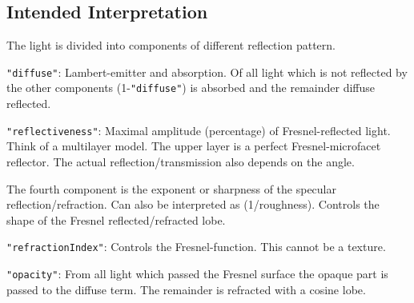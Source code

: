 \documentclass[english,10pt,a4paper,twocolumn,colorscheme=green]{orarticle}
\begin{document}
	\subsection{Intended Interpretation}
	The light is divided into components of different reflection pattern.
	
	\lstinline|"diffuse"|: Lambert-emitter and absorption. Of all light which is not reflected by the other components (1-\lstinline|"diffuse"|) is absorbed and the remainder diffuse reflected.
	
	\lstinline|"reflectiveness"|: Maximal amplitude (percentage) of Fresnel-reflected light. Think of a multilayer model. The upper layer is a perfect Fresnel-microfacet reflector. The actual reflection/transmission also depends on the angle.
	
	The fourth component is the exponent or sharpness of the specular reflection/refraction. Can also be interpreted as (1/roughness). Controls the shape of the Fresnel reflected/refracted lobe.
	
	\lstinline|"refractionIndex"|: Controls the Fresnel-function. This cannot be a texture.
	
	\lstinline|"opacity"|: From all light which passed the Fresnel surface the opaque part is passed to the diffuse term. The remainder is refracted with a cosine lobe. %
\end{document}
